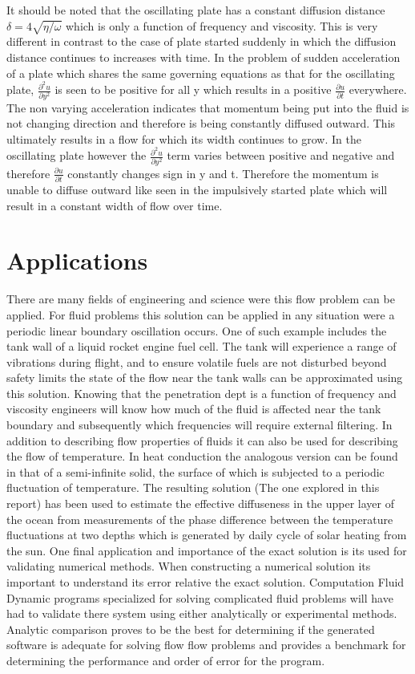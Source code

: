 \documentclass[paper=a4, fontsize=12pt, abstract=on]{scrartcl}
\numberwithin{equation}{section}		%
\numberwithin{figure}{section}			%
\numberwithin{table}{section}				%
\begin{document}
It should be noted that the oscillating plate has a constant diffusion distance $\delta = 4\sqrt{\eta/\omega}$ which is only a function of frequency and viscosity. This is very different in contrast to the case of plate started suddenly in which the diffusion distance continues to increases with time. In the problem of sudden acceleration of a plate which shares the same governing equations as that for the oscillating plate,
$\frac{\partial^2 u}{\partial y^2}$ is seen to be positive for all y which results in a positive $\frac{\partial u}{\partial t}$
everywhere. The non varying acceleration indicates that momentum being put into the fluid is not changing direction and therefore is being constantly
diffused outward. This ultimately results in a flow for which its width continues to grow. In the oscillating plate however the $\frac{\partial^2 u}{\partial y^2}$ term varies between positive and negative and therefore $\frac{\partial u}{\partial t}$ constantly changes sign in y and t. Therefore the momentum is unable to diffuse outward like seen in the impulsively started plate which will result in a constant width of flow over time.



\section{Applications}
There are many fields of engineering and science were this flow problem can be applied. 
For fluid problems this solution can be applied in any situation were a periodic linear boundary oscillation occurs. One of such example includes the tank wall of a liquid rocket engine fuel cell. The tank will experience a range of vibrations during flight, and to ensure volatile fuels are not disturbed beyond safety limits the state of the flow near the tank walls can be approximated using this solution. Knowing that the penetration dept is a function of frequency and viscosity engineers will know how much of the fluid is affected near the tank boundary and subsequently which frequencies will require external filtering. 
 In addition to describing flow properties of fluids it can also be used for describing the flow of temperature. In heat conduction the analogous version can be found in that of a semi-infinite solid, the surface of which is subjected to a periodic fluctuation of temperature. The resulting solution (The one explored in this report) has been used to estimate the effective diffuseness in the upper layer of the ocean from measurements of the phase difference between the temperature fluctuations at two
depths which is generated by daily cycle of solar heating from the sun.
One final application and importance of the exact solution is its used for validating numerical methods. When constructing a numerical solution its important to understand its error relative the exact solution. Computation Fluid Dynamic programs specialized for solving complicated fluid problems will have had to validate there system using either analytically or experimental methods. Analytic comparison proves to be the best for determining if the generated software is adequate for solving flow flow problems and provides a benchmark for determining the performance and order of error for the program.
\end{document}
